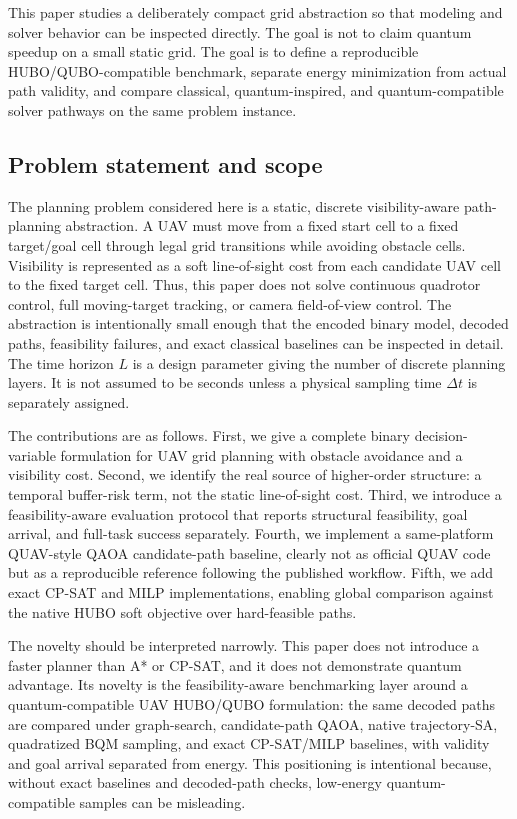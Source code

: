 \documentclass[10pt,conference]{IEEEtran}
\begin{document}
This paper studies a deliberately compact grid abstraction so that modeling and solver behavior can be inspected directly. The goal is not to claim quantum speedup on a small static grid. The goal is to define a reproducible HUBO/QUBO-compatible benchmark, separate energy minimization from actual path validity, and compare classical, quantum-inspired, and quantum-compatible solver pathways on the same problem instance.

\subsection{Problem statement and scope}
The planning problem considered here is a static, discrete visibility-aware path-planning abstraction. A UAV must move from a fixed start cell to a fixed target/goal cell through legal grid transitions while avoiding obstacle cells. Visibility is represented as a soft line-of-sight cost from each candidate UAV cell to the fixed target cell. Thus, this paper does not solve continuous quadrotor control, full moving-target tracking, or camera field-of-view control. The abstraction is intentionally small enough that the encoded binary model, decoded paths, feasibility failures, and exact classical baselines can be inspected in detail. The time horizon $L$ is a design parameter giving the number of discrete planning layers. It is not assumed to be seconds unless a physical sampling time $\Delta t$ is separately assigned.

The contributions are as follows. First, we give a complete binary decision-variable formulation for UAV grid planning with obstacle avoidance and a visibility cost. Second, we identify the real source of higher-order structure: a temporal buffer-risk term, not the static line-of-sight cost. Third, we introduce a feasibility-aware evaluation protocol that reports structural feasibility, goal arrival, and full-task success separately. Fourth, we implement a same-platform QUAV-style QAOA candidate-path baseline, clearly not as official QUAV code but as a reproducible reference following the published workflow. Fifth, we add exact CP-SAT and MILP implementations, enabling global comparison against the native HUBO soft objective over hard-feasible paths.

The novelty should be interpreted narrowly. This paper does not introduce a faster planner than A* or CP-SAT, and it does not demonstrate quantum advantage. Its novelty is the feasibility-aware benchmarking layer around a quantum-compatible UAV HUBO/QUBO formulation: the same decoded paths are compared under graph-search, candidate-path QAOA, native trajectory-SA, quadratized BQM sampling, and exact CP-SAT/MILP baselines, with validity and goal arrival separated from energy. This positioning is intentional because, without exact baselines and decoded-path checks, low-energy quantum-compatible samples can be misleading.
\end{document}

